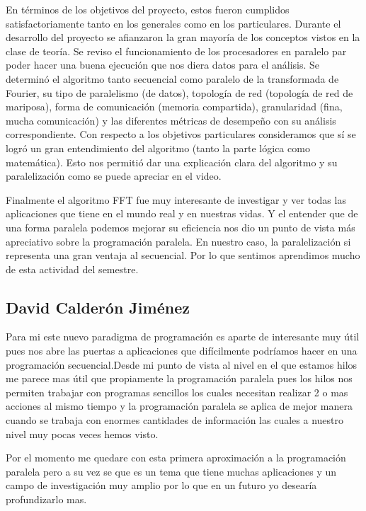\documentclass{report}
\begin{document}
En términos de los objetivos del proyecto, estos fueron cumplidos satisfactoriamente tanto en los generales como en los particulares. Durante el desarrollo del proyecto se afianzaron la gran mayoría de los conceptos vistos en la clase de teoría. Se reviso el funcionamiento de los procesadores en paralelo par poder hacer una buena ejecución que nos diera datos para el análisis. Se determinó el algoritmo tanto secuencial como paralelo de la transformada de Fourier, su tipo de paralelismo (de datos), topología de red (topología de red de mariposa), forma de comunicación (memoria compartida), granularidad (fina, mucha comunicación) y las diferentes métricas de desempeño con su análisis correspondiente. Con respecto a los objetivos particulares consideramos que sí se logró un gran entendimiento del algoritmo (tanto la parte lógica como matemática). Esto nos permitió dar una explicación clara del algoritmo y su paralelización como se puede apreciar en el video.\medskip

Finalmente el algoritmo FFT fue muy interesante de investigar y ver todas las aplicaciones que tiene en el mundo real y en nuestras vidas. Y el entender que de una forma paralela podemos mejorar su eficiencia nos dio un punto de vista más apreciativo sobre la programación paralela. En nuestro caso, la paralelización si representa una gran ventaja al secuencial. Por lo que sentimos aprendimos mucho de esta actividad del semestre.

\clearpage
\subsection*{David Calderón Jiménez}
Para mi este nuevo paradigma de programación es aparte de interesante muy útil pues nos abre las puertas a aplicaciones que difícilmente podríamos hacer en una programación secuencial.Desde mi punto de vista al nivel en el que estamos hilos me parece mas útil que propiamente la programación paralela pues los hilos nos permiten trabajar con programas sencillos los cuales necesitan realizar 2 o mas 
acciones al mismo tiempo y la programación paralela se aplica de mejor manera cuando se trabaja con enormes cantidades de información las cuales a nuestro nivel muy pocas veces hemos visto.

Por el momento me quedare con esta primera aproximación a la programación paralela pero a su vez se que es un tema que tiene muchas aplicaciones y un campo de investigación muy amplio por lo que en un futuro yo desearía profundizarlo mas.
\end{document}
